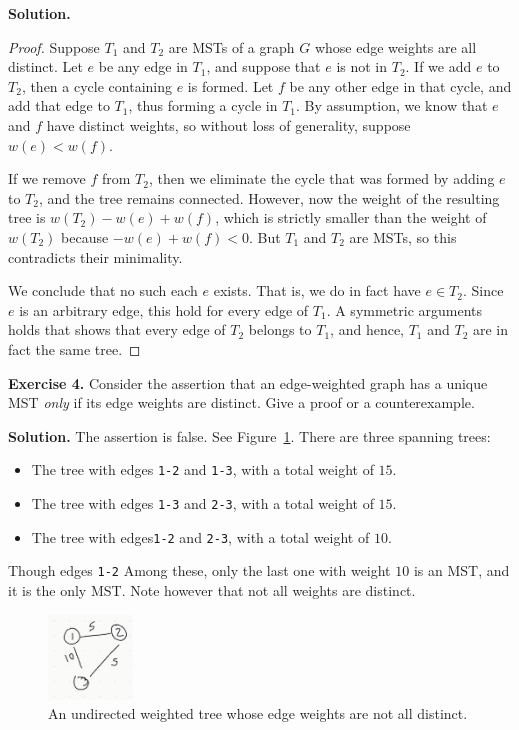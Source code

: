 \documentclass[12pt, a4paper]{article}
\newenvironment{ex}[2][Exercise]
{\par\medskip\noindent \textbf{#1 #2.}}
{\medskip}
\newenvironment{sol}[1][Solution]
{\par\medskip\noindent \textbf{#1.} }
{\medskip}
\begin{document}
	\begin{sol}
		\begin{proof}
			Suppose $T_1$ and $T_2$ are MSTs of a graph $G$ whose edge weights
			are all distinct. Let $e$ be any edge in $T_1$, and suppose that
			$e$ is not in $T_2$. If we add $e$ to $T_2$, then a cycle containing
			$e$ is formed. Let $f$ be any other edge in that cycle, and add
			that edge to $T_1$, thus forming a cycle in $T_1$. By assumption,
			we know that $e$ and $f$ have distinct weights, so without loss
			of generality, suppose $w(e)<w(f)$.
			
			If we remove $f$ from $T_2$, then we eliminate the cycle that was formed
			by adding $e$ to $T_2$, and the tree remains connected. However, now the weight
			of the resulting tree is $w(T_2)-w(e)+w(f)$, which is strictly smaller
			than the weight of $w(T_2)$ because $-w(e)+w(f)<0$. But $T_1$ and
			$T_2$ are MSTs, so this contradicts their minimality.
			
			We conclude that no such each $e$ exists. That is, we do in fact have
			$e\in T_2$. Since $e$ is an arbitrary edge, this hold for every edge of $T_1$.
			A symmetric arguments holds that shows that every edge of $T_2$
			belongs to $T_1$, and hence, $T_1$ and $T_2$ are in fact the
			same tree.
		\end{proof}
	\end{sol}
	\begin{ex}{4}
		Consider the assertion that an edge-weighted graph has a unique MST \emph{only} if
		its edge weights are distinct. Give a proof or a counterexample.
	\end{ex}
	\begin{sol}
		The assertion is false. See Figure~\ref{fig:ex-04}. There are three spanning
		trees:
		\begin{itemize}
			\item The tree with edges \texttt{1-2} and \texttt{1-3}, with a total weight of $15$.
			\item The tree with edges \texttt{1-3} and \texttt{2-3}, with a total weight of $15$.
			\item The tree with edges\texttt{1-2} and \texttt{2-3}, with a total weight of $10$.
		\end{itemize}Though edges \texttt{1-2}
		Among these, only the last one with weight $10$ is an MST, and it is the only MST.
		Note however that not all weights are distinct.
		\begin{figure}
			\centering
			\includegraphics[width=0.2\textwidth]{exercise-04}
			\caption{An undirected weighted tree whose edge weights are not all distinct.}
			\label{fig:ex-04}
		\end{figure}
		
	\end{sol}
\end{document}
